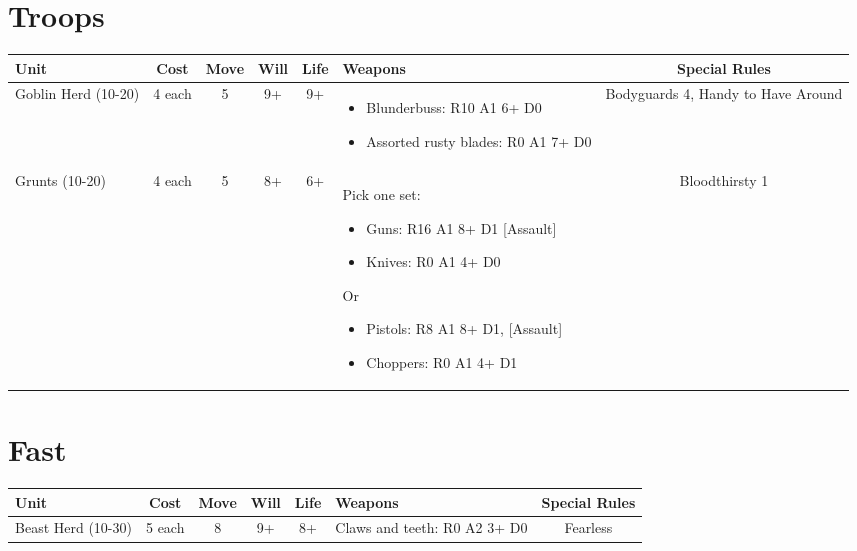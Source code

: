 \documentclass[landscape]{extarticle}
\begin{document}
\begin{small}
\section*{Troops}

\begin{tabular}{UccccWS}

\textbf{Unit} & \textbf{Cost} & \textbf{Move} & \textbf{Will} & \textbf{Life} & \textbf{Weapons} & \textbf{Special Rules} \\


\hline


Goblin Herd (10-20)
&
4 each
&
5
&
9+
&
9+
&
\begin{itemize}
    \item Blunderbuss: R10 A1 6+ D0
    \item Assorted rusty blades: R0 A1 7+ D0
\end{itemize}
&
Bodyguards 4, Handy to Have Around


\\


Grunts (10-20)
&
4 each
&
5
&
8+
&
6+
&
Pick one set:
\begin{itemize}
    \item Guns: R16 A1 8+ D1 [Assault]
    \item Knives: R0 A1 4+ D0
\end{itemize}
Or
\begin{itemize}
    \item Pistols: R8 A1 8+ D1, [Assault]
    \item Choppers: R0 A1 4+ D1
\end{itemize}
&
Bloodthirsty 1
\end{tabular}







\section*{Fast}

\begin{tabular}{UccccWS}

\textbf{Unit} & \textbf{Cost} & \textbf{Move} & \textbf{Will} & \textbf{Life} & \textbf{Weapons} & \textbf{Special Rules} \\


\hline


Beast Herd (10-30)
&
5 each
&
8
&
9+
&
8+
&
Claws and teeth: R0 A2 3+ D0
&
Fearless




\end{tabular}
\end{small}
\end{document}
